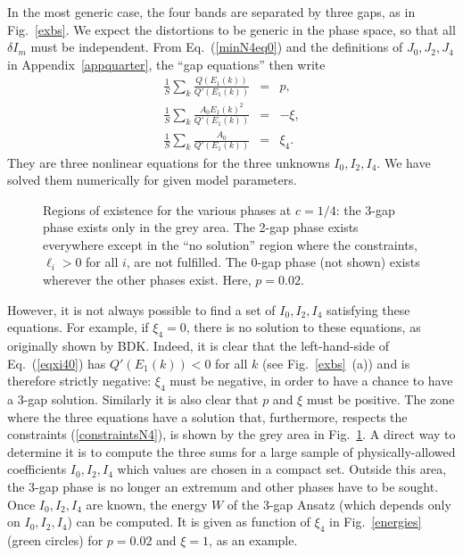 \documentclass[]{revtex4-1}
\begin{document}
In the most generic case, the four bands are separated by three gaps, as in Fig.~\ref{exbs}. We expect the distortions to be generic in the phase space, so that all  $\delta I_m$ must be independent.
From Eq.~(\ref{minN4eq0}) and the definitions of $J_0,J_2,J_4$ in Appendix~\ref{appquarter}, the ``gap equations'' then write
\begin{eqnarray}
    \frac{1}{S} \sum_{k}  \frac{Q(E_1(k))}{Q'(E_1(k))}  &=& p,\\
     \frac{1}{S} \sum_{k}  \frac{A_0E_1(k)^2}{Q'(E_1(k))} &=& -\xi, \\
  \frac{1}{S} \sum_{k}  \frac{A_0}{Q'(E_1(k))} &=& \xi_4. \label{eqxi40}
\end{eqnarray}
They are three nonlinear equations for the three unknowns $I_0,I_2,I_4$. We have solved them numerically for given model parameters.
\begin{figure}[h]
  \begin{center}   
  \end{center}       \caption{Regions of existence for the various phases at $c=1/4$: the 3-gap phase exists only in the grey area. The 2-gap phase exists everywhere except in the ``no solution'' region where the constraints, $\ell_i>0$ for all $i$, are not fulfilled. The 0-gap phase (not shown) exists wherever the other phases exist. Here, $p=0.02$.}
  \label{energies0}
\end{figure}
However, it is not always possible to find a set of $I_0,I_2,I_4$ satisfying these equations. For example, if $\xi_4=0$, there is no solution to these equations, as originally shown by BDK.  Indeed, it is clear that the left-hand-side of Eq.~(\ref{eqxi40}) has $Q'(E_1(k))<0$ for all $k$ (see Fig.~\ref{exbs}~(a)) and is therefore strictly negative: $\xi_4$ must be negative, in order to have a chance to have a 3-gap solution.  Similarly it is also clear that $p$ and $\xi$ must be positive.
The zone where the three equations have a solution that, furthermore, respects the constraints (\ref{constraintsN4}), is shown by the grey area in Fig.~\ref{energies0}. A direct way to determine it is to compute the three sums for a large sample of physically-allowed coefficients $I_0,I_2,I_4$ which values are chosen in a compact set. Outside this area, the 3-gap phase is no longer an extremum and
other phases have to be sought. Once $I_0, I_2, I_4$ are known, the energy $W$ of the 3-gap Ansatz (which depends only on $I_0,I_2,I_4$) can be computed. It is given  as function of $\xi_4$ in Fig.~\ref{energies} (green circles) for $p=0.02$ and $\xi=1$, as an example.
\end{document}
